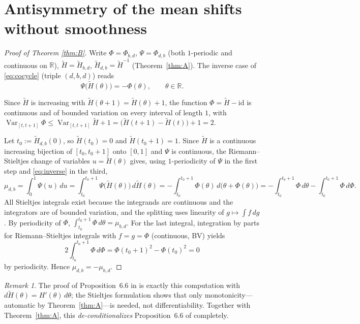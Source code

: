\documentclass[11pt]{article}
\theoremstyle{definition}
\theoremstyle{remark}
\newtheorem{remark}[theorem]{Remark}
\newcommand{\R}{\mathbb{R}}
\newcommand{\Ht}{\widetilde H}
\DeclareMathOperator{\Var}{Var}
\begin{document}
\section{Antisymmetry of the mean shifts without smoothness}\label{sec:anti}

\begin{proof}[Proof of Theorem \textup{\ref{thm:B}}]
Write $\Phi=\Phi_{b,d}$, $\Psi=\Phi_{d,b}$ (both $1$-periodic and
continuous on $\R$), $\Ht=\Ht_{b,d}$, $\Ht_{d,b}=\Ht^{-1}$
(Theorem~\ref{thm:A}). The inverse case of \eqref{eq:cocycle} (triple
$(d,b,d)$) reads
\begin{equation}\label{eq:inverse}
\Psi\big(\Ht(\theta)\big)=-\Phi(\theta),\qquad\theta\in\R .
\end{equation}

Since $\Ht$ is increasing with $\Ht(\theta+1)=\Ht(\theta)+1$, the function
$\Phi=\Ht-\mathrm{id}$ is continuous and of bounded variation on every
interval of length $1$, with
$\Var_{[t,t+1]}\Phi\le\Var_{[t,t+1]}\Ht+1=\big(\Ht(t+1)-\Ht(t)\big)+1=2$.

Let $t_0:=\Ht_{d,b}(0)$, so $\Ht(t_0)=0$ and $\Ht(t_0+1)=1$. Since $\Ht$
is a continuous increasing bijection of $[t_0,t_0+1]$ onto $[0,1]$ and
$\Psi$ is continuous, the Riemann--Stieltjes change of variables
$u=\Ht(\theta)$ \cite[Thm.~7.7]{Apostol} gives, using $1$-periodicity of
$\Psi$ in the first step and \eqref{eq:inverse} in the third,
\[
\mu_{d,b}=\int_0^1\Psi(u)\,du
=\int_{t_0}^{t_0+1}\Psi\big(\Ht(\theta)\big)\,d\Ht(\theta)
=-\int_{t_0}^{t_0+1}\Phi(\theta)\,d\big(\theta+\Phi(\theta)\big)
=-\int_{t_0}^{t_0+1}\Phi\,d\theta-\int_{t_0}^{t_0+1}\Phi\,d\Phi .
\]
All Stieltjes integrals exist because the integrands are continuous and
the integrators are of bounded variation, and the splitting uses linearity
of $g\mapsto\int f\,dg$. By periodicity of $\Phi$,
$\int_{t_0}^{t_0+1}\Phi\,d\theta=\mu_{b,d}$. For the last integral,
integration by parts for Riemann--Stieltjes integrals
\cite[Thm.~7.6]{Apostol} with $f=g=\Phi$ (continuous, BV) yields
\[
2\int_{t_0}^{t_0+1}\Phi\,d\Phi
=\Phi(t_0+1)^2-\Phi(t_0)^2=0
\]
by periodicity. Hence $\mu_{d,b}=-\mu_{b,d}$.
\end{proof}

\begin{remark}\label{rem:deconditional}
The proof of Proposition~6.6 in \cite{J} is exactly this computation with
$d\Ht(\theta)=H'(\theta)\,d\theta$; the Stieltjes formulation shows that
only monotonicity---automatic by Theorem~\ref{thm:A}---is needed, not
differentiability. Together with Theorem~\ref{thm:A}, this
\emph{de-conditionalizes} Proposition~6.6 of \cite{J} completely.
\end{remark}
\end{document}
